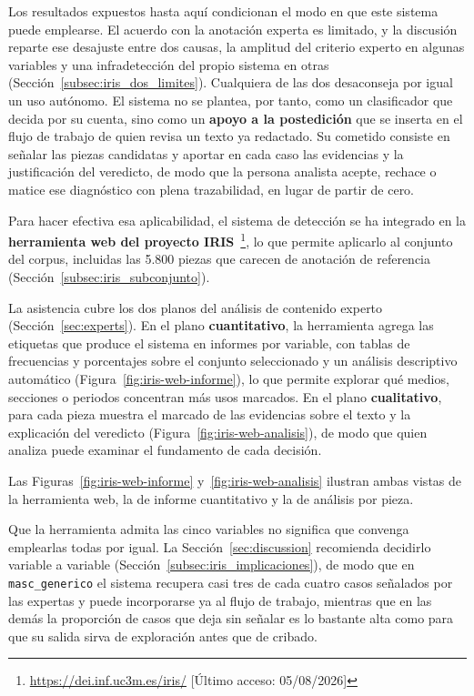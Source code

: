 
Los resultados expuestos hasta aquí condicionan el modo en que este sistema puede
emplearse. El acuerdo con la anotación experta es limitado, y la discusión reparte ese
desajuste entre dos causas, la amplitud del criterio experto en algunas variables y una
infradetección del propio sistema en otras (Sección~\ref{subsec:iris_dos_limites}).
Cualquiera de las dos desaconseja por igual un uso autónomo. El sistema no se plantea,
por tanto, como un clasificador que decida por su cuenta, sino como un \textbf{apoyo a
la postedición} que se inserta en el flujo de trabajo de quien revisa un texto ya
redactado. Su cometido consiste en señalar las piezas candidatas y aportar en cada
caso las evidencias y la justificación del veredicto, de modo que la persona analista
acepte, rechace o matice ese diagnóstico con plena trazabilidad, en lugar de
partir de cero.

Para hacer efectiva esa aplicabilidad, el sistema de detección se ha integrado en
la \textbf{herramienta web del proyecto IRIS}~\cite{avi2026}\footnote{\url{https://dei.inf.uc3m.es/iris/} [Último acceso: 05/08/2026]},
lo que permite aplicarlo al conjunto del corpus, incluidas las 5.800 piezas que
carecen de anotación de referencia (Sección~\ref{subsec:iris_subconjunto}).

La asistencia cubre los dos planos del análisis de contenido experto
(Sección~\ref{sec:experts}). En el plano \textbf{cuantitativo}, la herramienta agrega
las etiquetas que produce el sistema en informes por variable, con tablas de
frecuencias y porcentajes sobre el conjunto seleccionado y un análisis descriptivo
automático (Figura~\ref{fig:iris-web-informe}), lo que permite explorar qué medios,
secciones o periodos concentran más usos marcados. En el plano \textbf{cualitativo},
para cada pieza muestra el marcado de las evidencias sobre el texto y la explicación
del veredicto (Figura~\ref{fig:iris-web-analisis}), de modo que quien analiza puede
examinar el fundamento de cada decisión.

Las Figuras~\ref{fig:iris-web-informe} y~\ref{fig:iris-web-analisis} ilustran ambas
vistas de la herramienta web, la de informe cuantitativo y la de análisis por pieza.

Que la herramienta admita las cinco variables no significa que convenga emplearlas
todas por igual. La Sección~\ref{sec:discussion} recomienda decidirlo variable a variable
(Sección~\ref{subsec:iris_implicaciones}), de modo que en \texttt{masc\_generico} el
sistema recupera casi tres de cada cuatro casos señalados por las expertas y puede
incorporarse ya al flujo de trabajo, mientras que en las demás la proporción de casos
que deja sin señalar es lo bastante alta como para que su salida sirva de exploración
antes que de cribado.

